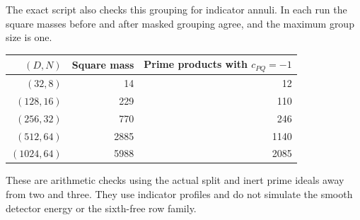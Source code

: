 \documentclass[11pt]{article}
\begin{document}
The exact script also checks this grouping for indicator annuli.
In each run the square masses before and after masked grouping agree,
and the maximum group size is one.
\begin{center}
\begin{tabular}{rrr}
\((D,N)\) & Square mass & Prime products with \(c_{PQ}=-1\)\\
\hline
\((32,8)\) & 14 & 12\\
\((128,16)\) & 229 & 110\\
\((256,32)\) & 770 & 246\\
\((512,64)\) & 2885 & 1140\\
\((1024,64)\) & 5988 & 2085
\end{tabular}
\end{center}
These are arithmetic checks using the actual split and inert prime
ideals away from two and three. They use indicator profiles and do
not simulate the smooth detector energy or the sixth-free row family.
\end{document}
